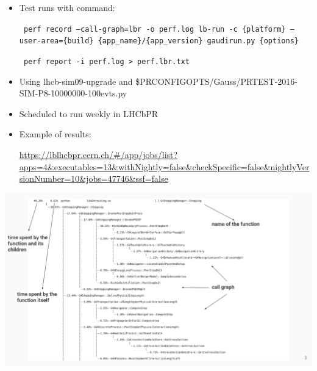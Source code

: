 {\begin{frame}
\begin{itemize}
\item Test runs with command:

\texttt{
perf record --call-graph=lbr -o perf.log lb-run -c \{platform\} --user-area=\{build\} \{app\_name\}/\{app\_version\} gaudirun.py \{options\}
}

\texttt{
perf report -i perf.log > perf.lbr.txt
}
\item Using lhcb-sim09-upgrade and \$PRCONFIGOPTS/Gauss/PRTEST-2016-SIM-P8-10000000-100evts.py
\item Scheduled to run weekly in LHCbPR
\item Example of results:

\tiny \url{https://lblhcbpr.cern.ch/\#/app/jobs/list?apps=4\&executables=13\&withNightly=false\&checkSpecific=false\&nightlyVersionNumber=10\&jobs=47746\&ssf=false}
 \end{itemize}

\end{frame}

\begin{frame}
\centering
\includegraphics[width=1.09\textwidth]{perf.png}
\end{frame}


}
